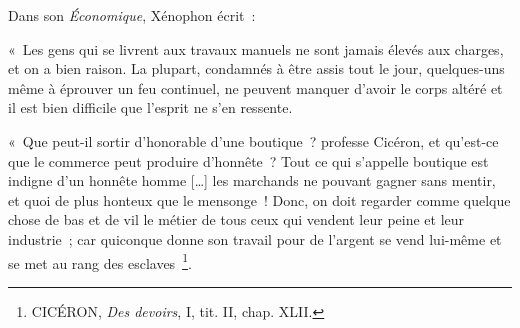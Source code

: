 \documentclass[french,twoside]{book} %
\newenvironment{quoteblock}%
  {\begin{quoting}}
  {\end{quoting}}
\newenvironment{quotebar}{%
    \def\FrameCommand{{\color{rubric!10!}\vrule width 0.5em} \hspace{0.9em}}%
    \def\OuterFrameSep{\itemsep} %
    \MakeFramed {\advance\hsize-\width \FrameRestore}
  }%
  {%
    \endMakeFramed
  }
\renewenvironment{quoteblock}%
  {%
    \savenotes
    \setstretch{0.9}
    \normalfont
    \begin{quotebar}
  }
  {%
    \end{quotebar}
    \spewnotes
  }
\begin{document}
\noindent Dans son \emph{Économique}, Xénophon écrit :\par

\begin{quoteblock}
 \noindent « Les gens qui se livrent aux travaux manuels ne sont jamais élevés aux charges, et on a bien raison. La plupart, condamnés à être assis tout le jour, quelques-uns même à éprouver un feu continuel, ne peuvent manquer d’avoir le corps altéré et il est bien difficile que l’esprit ne s’en ressente.\par
 « Que peut-il sortir d’honorable d’une boutique ? professe Cicéron, et qu’est-ce que le commerce peut produire d’honnête ? Tout ce qui s’appelle boutique est indigne d’un honnête homme […] les marchands ne pouvant gagner sans mentir, et quoi de plus honteux que le mensonge ! Donc, on doit regarder comme quelque chose de bas et de vil le métier de tous ceux qui vendent leur peine et leur industrie ; car quiconque donne son travail pour de l’argent se vend lui-même et se met au rang des esclaves \footnote{CICÉRON, \emph{Des devoirs}, I, tit. II, chap. XLII.}.
\end{quoteblock}
\end{document}
